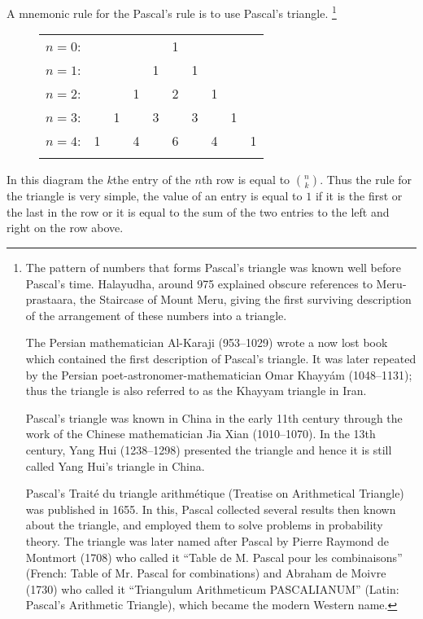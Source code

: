 A mnemonic rule for the Pascal's rule is to use Pascal's triangle.
\footnote{
  The pattern of numbers that forms Pascal's triangle was known well before
  Pascal's time.  Halayudha, around 975 explained obscure references to
  Meru-prastaara, the Staircase of Mount Meru, giving the first surviving
  description of the arrangement of these numbers into a triangle.

  The Persian mathematician Al-Karaji (953–1029) wrote a now lost book which
  contained the first description of Pascal's triangle. It was later repeated by
  the Persian poet-astronomer-mathematician Omar Khayyám (1048–1131); thus the
  triangle is also referred to as the Khayyam triangle in Iran.

  Pascal's triangle was known in China in the early 11th century through the
  work of the Chinese mathematician Jia Xian (1010–1070). In the 13th century,
  Yang Hui (1238–1298) presented the triangle and hence it is still called Yang
  Hui's triangle in China.

  Pascal's Traité du triangle arithmétique (Treatise on Arithmetical Triangle)
  was published in 1655. In this, Pascal collected several results then known
  about the triangle, and employed them to solve problems in probability theory.
  The triangle was later named after Pascal by Pierre Raymond de Montmort (1708)
  who called it ``Table de M. Pascal pour les combinaisons'' (French: Table of
  Mr. Pascal for combinations) and Abraham de Moivre (1730) who called it
  ``Triangulum Arithmeticum PASCALIANUM'' (Latin: Pascal's Arithmetic Triangle),
  which became the modern Western name.
}
\begin{figure}
  \centering
  \begin{tabular}{rccccccccc}
    $n = 0$:&    &    &    &    &  1\\\noalign{\smallskip\smallskip}
    $n = 1$:&    &    &    &  1 &    &  1\\\noalign{\smallskip\smallskip}
    $n = 2$:&    &    &  1 &    &  2 &    &  1\\\noalign{\smallskip\smallskip}
    $n = 3$:&    &  1 &    &  3 &    &  3 &    &  1\\\noalign{\smallskip\smallskip}
    $n = 4$:&  1 &    &  4 &    &  6 &    &  4 &    &  1\\\noalign{\smallskip\smallskip}
  \end{tabular}
\end{figure}
In this diagram the $k$the entry of the $n$th row is equal to $\binom{n}{k}$.
Thus the rule for the triangle is very simple, the value of an entry is equal
to $1$ if it is the first or the last in the row or it is equal to the sum
of the two entries to the left and right on the row above.

